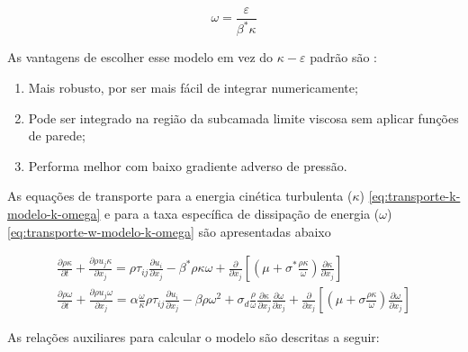 \begin{equation}
	\label{eq:omega-k-omega}
	\omega = \frac{\varepsilon}{\beta^{*}\kappa}
\end{equation}

As vantagens de escolher esse modelo em vez do $\kappa-\varepsilon$ padrão são \cite{Moukalled2015}:

\begin{enumerate}

	\item Mais robusto, por ser mais fácil de integrar numericamente;
	
	\item Pode ser integrado na região da subcamada limite viscosa sem aplicar funções de parede;

	\item Performa melhor com baixo gradiente adverso de pressão.
	
\end{enumerate}

As equações de transporte para a energia cinética turbulenta ($\kappa$) \ref{eq:transporte-k-modelo-k-omega} e para a taxa específica de dissipação de energia ($\omega$) \ref{eq:transporte-w-modelo-k-omega} são apresentadas abaixo \cite{Wilcox1988ReassessmentOT,Wilcox2006,Wilcox2008}

\begin{gather}
    \frac{\partial\rho\kappa}{\partial t} + \frac{\partial \rho u_{j}\kappa}{\partial x_j} = \rho\tau_{ij}\frac{\partial u_i}{\partial x_j} - \beta^{*}\rho\kappa\omega + \frac{\partial}{\partial x_j}\left[\left(\mu + \sigma^{*}\frac{\rho\kappa}{\omega}\right)\frac{\partial\kappa}{\partial x_j}\right]
    \label{eq:transporte-k-modelo-k-omega}
    \\
   	\frac{\partial \rho\omega}{\partial t} + \frac{\partial\rho u_j\omega}{\partial x_j} = \alpha\frac{\omega}{\kappa}\rho\tau_{ij}\frac{\partial u_i}{\partial x_j} - \beta\rho\omega^{2} + \sigma_{d}\frac{\rho}{\omega}\frac{\partial\kappa}{\partial x_j}\frac{\partial\omega}{\partial x_j} + \frac{\partial}{\partial x_j}\left[\left(\mu + \sigma\frac{\rho\kappa}{\omega}\right)\frac{\partial\omega}{\partial x_j}\right]
    \label{eq:transporte-w-modelo-k-omega}
\end{gather}

As relações auxiliares para calcular o modelo são descritas a seguir:

